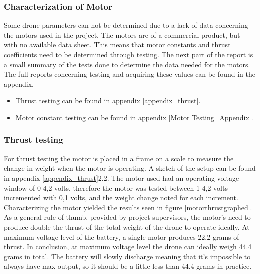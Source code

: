 \subsubsection{Characterization of Motor}
Some drone parameters can not be determined due to a lack of data concerning the motors used in the project. The motors are of a commercial product, but with no available data sheet. This means that motor constants and thrust coefficients need to be determined through testing. 
The next part of the report is a small summary of the tests done to determine the data needed for the motors. The full reports concerning testing and acquiring these values can be found in the appendix. 
\begin{itemize}
    \item Thrust testing can be found in appendix \ref{appendix_thrust}.
    \item Motor constant testing can be found in appendix \ref{Motor Testing_Appendix}.
\end{itemize}

\subsubsection{Thrust testing}

For thrust testing the motor is placed in a frame on a scale to measure the change in weight when the motor is operating. A sketch of the setup can be found in appendix \ref{appendix_thrust}2.2. The motor used had an operating voltage window of 0-4,2 volts, therefore the motor was tested between 1-4,2 volts incremented with 0,1 volts, and the weight change noted for each increment. Characterizing the motor yielded the results seen in figure \ref{motorthrustgraphed}. As a general rule of thumb, provided by project supervisors, the motor's need to produce double the thrust of the total weight of the drone to operate ideally. At maximum voltage level of the battery, a single motor produces 22.2 grams of thrust. In conclusion, at maximum voltage level the drone can ideally weigh 44.4 grams in total. The battery will slowly discharge meaning that it's impossible to always have max output, so it should be a little less than 44.4 grams in practice.

